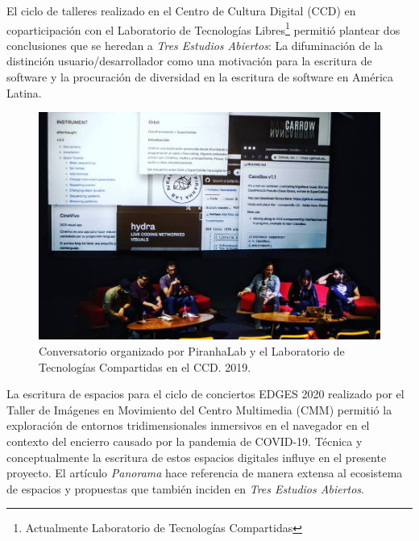 
El ciclo de talleres realizado en el Centro de Cultura Digital (CCD) en coparticipación con el Laboratorio de Tecnologías Libres\footnote{Actualmente Laboratorio de Tecnologías Compartidas} permitió plantear dos conclusiones que se heredan a \textit{Tres Estudios Abiertos}: La difuminación de la distinción usuario/desarrollador como una motivación para la escritura de software y la procuración de diversidad en la escritura de software en América Latina.

\begin{figure} 
\includegraphics[width=\columnwidth]{../img/conversatorio.jpg} 
\caption[Conversatorio CCD]{Conversatorio organizado por PiranhaLab y el Laboratorio de Tecnologías Compartidas en el CCD. 2019.} %
\label{fig:gallery} 
\end{figure}
  

La escritura de espacios para el ciclo de conciertos EDGES 2020 realizado por el Taller de Imágenes en Movimiento del Centro Multimedia (CMM) permitió la exploración de entornos tridimensionales inmersivos en el navegador en el contexto del encierro causado por la pandemia de COVID-19. Técnica y conceptualmente la escritura de estos espacios digitales influye en el presente proyecto. El artículo \textit{Panorama} \citep{panoramaArticulo} hace referencia de manera extensa al ecosistema de espacios y propuestas que también inciden en \textit{Tres Estudios Abiertos}.

